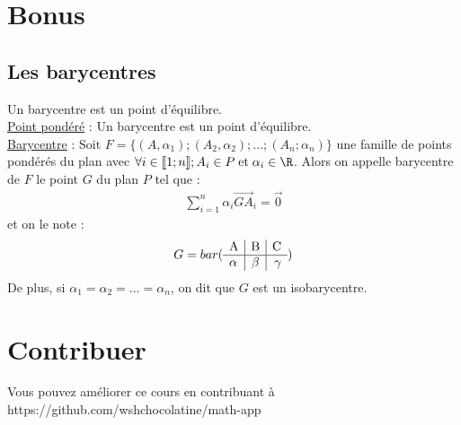\documentclass{report}
\begin{document}
\chapter{Bonus}

\section{Les barycentres}
Un barycentre est un point d’équilibre.  \\

\noindent \underline{Point pondéré} : Un barycentre est un point d’équilibre. \\

\noindent \underline{Barycentre} : Soit $F=\{(A,\alpha_1);(A_2,\alpha_2);\dots;(A_n;\alpha_n)\}$ une famille de points pondérés du plan avec $\forall i \in [\![1;n]\!] ; A_i \in P \; \text{et} \; \alpha_i \in \R $. Alors on appelle barycentre de $F$ le point $G$ du plan $P $ tel que : 
\begin{gather}
    \sum_{i=1}^{n} \alpha_i \overrightarrow{GA}_i = \overrightarrow{0}
\end{gather}
et on le note : 
\begin{gather}
    G = bar(\begin{array}{l|c|r} \rm A & \rm B & \rm C \\ \hline \alpha & \beta & \gamma \end{array})
\end{gather}
De plus, si $\alpha_1 = \alpha_2 = \dots = \alpha_n$, on dit que $G$ est un isobarycentre.

\chapter{Contribuer}

Vous pouvez améliorer ce cours en contribuant à https://github.com/wshchocolatine/math-app
\end{document}
